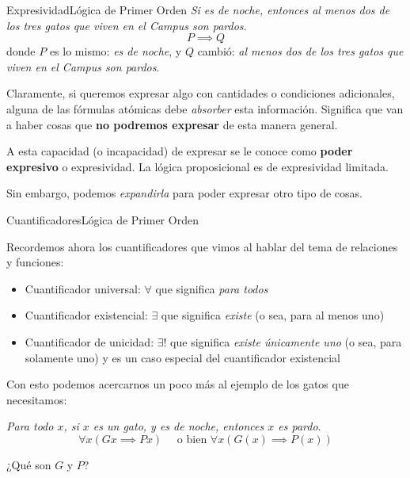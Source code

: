 \documentclass[spanish, c]{beamer}
\begin{document}
\begin{frame}{Expresividad}{Lógica de Primer Orden}
    \textit{Si es de noche, entonces al menos dos de los tres gatos que viven en el Campus son pardos.} \pause
    $$P \implies Q$$
    donde $P$ es lo mismo: \textit{es de noche}, y $Q$ cambió: \textit{al menos dos de los tres gatos que viven en el Campus son pardos}. \pause
    
    \bigskip

    Claramente, si queremos expresar algo con cantidades o condiciones adicionales, alguna de las fórmulas atómicas debe \textit{absorber} esta información. Significa que van a haber cosas que \textbf{no podremos expresar} de esta manera general. \pause

    A esta capacidad (o incapacidad) de expresar se le conoce como \textbf{poder expresivo} o \alert{expresividad}. La lógica proposicional es de expresividad limitada.
    
    Sin embargo, podemos \textit{expandirla} para poder expresar otro tipo de cosas.
\end{frame}

\begin{frame}{Cuantificadores}{Lógica de Primer Orden}

    Recordemos ahora los cuantificadores que vimos al hablar del tema de relaciones y funciones: \pause

    \begin{itemize}[<+->]
        \item Cuantificador universal: $\forall$ que significa \textit{para todos}
        \item Cuantificador existencial: $\exists$ que significa \textit{existe} (o sea, para al menos uno)
        \item Cuantificador de unicidad: $\exists!$ que significa \textit{existe únicamente uno} (o sea, para solamente uno) y es un caso especial del cuantificador existencial
    \end{itemize}

    \pause

    Con esto podemos acercarnos un poco más al ejemplo de los gatos que necesitamos: \pause

    \textit{Para todo $x$, si $x$ es un gato, y es de noche, entonces $x$ es pardo}.
    $$\forall x(Gx \implies Px) \quad \text{ o bien } \forall x(G(x) \implies P(x))$$ \pause
    
    ¿Qué son $G$ y $P$?
\end{frame}
\end{document}
